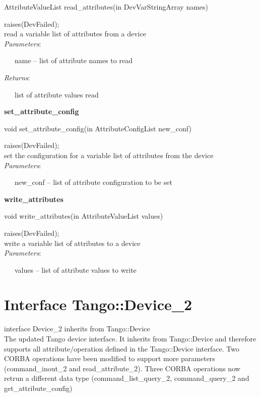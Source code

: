 AttributeValueList read\_attributes(in DevVarStringArray names)

raises(DevFailed);\\

read a variable list of attributes from a device\\

\emph{Parameters}:

~~~name – list of attribute names to read

\emph{Returns}:

~~~list of attribute values read\\

\begin{flushleft}
\textbf{set\_attribute\_config}
\par\end{flushleft}

void set\_attribute\_config(in AttributeConfigList new\_conf)

raises(DevFailed);\\

set the configuration for a variable list of attributes from the device\\

\emph{Parameters}:

~~~new\_conf – list of attribute configuration to be set\\

\begin{flushleft}
\textbf{write\_attributes}
\par\end{flushleft}

void write\_attributes(in AttributeValueList values)

raises(DevFailed);\\

write a variable list of attributes to a device\\

\emph{Parameters}:

~~~values – list of attribute values to write

\section{Interface Tango::Device\_2}

interface Device\_2 inherits from Tango::Device\\

The updated Tango device interface. It inherits from Tango::Device
and therefore supports all attribute/operation defined in the Tango::Device
interface. Two CORBA operations have been modified to support more
parameters (command\_inout\_2 and  read\_attribute\_2). Three CORBA
operations now retrun a different data type (command\_list\_query\_2,
command\_query\_2 and get\_attribute\_config)

